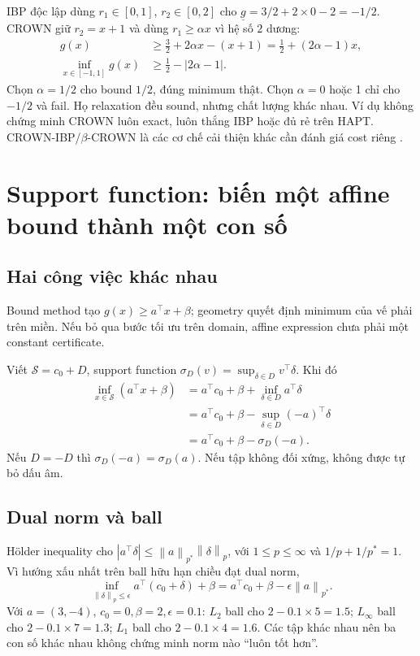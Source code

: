 \documentclass[11pt,a4paper]{article}
\newcommand{\norm}[1]{\left\lVert#1\right\rVert}
\newcommand{\Sset}{\mathcal S}
\theoremstyle{definition}
\begin{document}
IBP độc lập dùng $r_1\in[0,1]$, $r_2\in[0,2]$ cho
$\underline g=3/2+2\times0-2=-1/2$. CROWN giữ $r_2=x+1$ và dùng
$r_1\ge\alpha x$ vì hệ số $2$ dương:
\begin{align}
g(x)&\ge\frac32+2\alpha x-(x+1)
=\frac12+(2\alpha-1)x,\\
\inf_{x\in[-1,1]}g(x)&\ge\frac12-|2\alpha-1|.
\end{align}
Chọn $\alpha=1/2$ cho bound $1/2$, đúng minimum thật. Chọn $\alpha=0$
hoặc 1 chỉ cho $-1/2$ và fail. Họ relaxation đều sound, nhưng chất lượng
khác nhau. Ví dụ không chứng minh CROWN luôn exact, luôn thắng IBP hoặc
đủ rẻ trên HAPT. CROWN-IBP/$\beta$-CROWN là các cơ chế cải thiện khác cần
đánh giá cost riêng \cite{crownibp,betacrown}.

\section{Support function: biến một affine bound thành một con số}
\subsection{Hai công việc khác nhau}
Bound method tạo $g(x)\ge a^\top x+\beta$; geometry quyết định minimum của
vế phải trên miền. Nếu bỏ qua bước tối ưu trên domain, affine expression
chưa phải một constant certificate.

Viết $\Sset=c_0+D$, support function
$\sigma_D(v)=\sup_{\delta\in D}v^\top\delta$. Khi đó
\begin{align}
\inf_{x\in\Sset}(a^\top x+\beta)
&=a^\top c_0+\beta+\inf_{\delta\in D}a^\top\delta\\
&=a^\top c_0+\beta-\sup_{\delta\in D}(-a)^\top\delta\\
&=a^\top c_0+\beta-\sigma_D(-a).
\end{align}
Nếu $D=-D$ thì $\sigma_D(-a)=\sigma_D(a)$. Nếu tập không đối xứng, không
được tự bỏ dấu âm.

\subsection{Dual norm và ball}
Hölder inequality cho $|a^\top\delta|\le\norm{a}_{p^*}\norm{\delta}_p$,
với $1\le p\le\infty$ và $1/p+1/p^*=1$. Vì hướng xấu nhất trên ball hữu
hạn chiều đạt dual norm,
\begin{equation}
\inf_{\norm{\delta}_p\le\epsilon}a^\top(c_0+\delta)+\beta
=a^\top c_0+\beta-\epsilon\norm{a}_{p^*}.
\end{equation}
Với $a=(3,-4)$, $c_0=0,\beta=2,\epsilon=0.1$:
$L_2$ ball cho $2-0.1\times5=1.5$;
$L_\infty$ ball cho $2-0.1\times7=1.3$;
$L_1$ ball cho $2-0.1\times4=1.6$. Các tập khác nhau nên ba con số khác nhau
không chứng minh norm nào ``luôn tốt hơn''.
\end{document}
